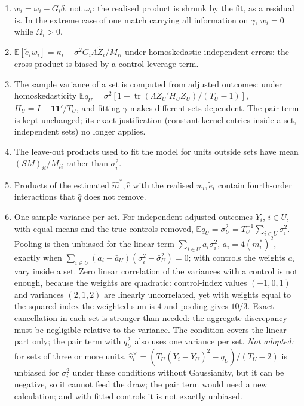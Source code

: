 \documentclass[11pt]{article}
\newcommand{\E}{\mathbb{E}}
\newcommand{\tr}{\operatorname{tr}}
\begin{document}
\begin{enumerate}
$\tr\{C(S_d-\hat H)C(S_d-\hat H)\}$, while $\hat L=4\hat m'(S_d-\hat H)\hat m$ exactly. The middle term is the average of
$u'\hat Hu$ over the existing draws; the last needs $2k$ further applications of $C$, whereas the present
implementation needs no linear solves beyond those of the model without controls. $S_d-\hat H$ need not be positive
semidefinite, so it cannot be drawn from.
\item $w_i=\omega_i-G_i\delta$, not $\omega_i$: the realised product is shrunk by the fit, as a residual is. In the
extreme case of one match carrying all information on $\gamma$, $w_i=0$ while $\Omega_i>0$.
\item $\E[\tilde e_iw_i]=\kappa_i-\sigma^2G_i\Lambda\tilde Z_i/M_{ii}$ under homoskedastic independent errors: the
cross product is biased by a control-leverage term.
\item The sample variance of a set is computed from adjusted outcomes: under homoskedasticity
$\E q_U=\sigma^2[1-\tr(\Lambda Z_U'H_UZ_U)/(T_U-1)]$, $H_U=I-\mathbf{11}'/T_U$, and fitting $\gamma$ makes different
sets dependent. The pair term is kept unchanged; its exact justification (constant kernel entries inside a set,
independent sets) no longer applies.
\item The leave-out products used to fit the model for units outside sets have mean $(SM)_{ii}/M_{ii}$ rather than
$\sigma_i^2$.
\item Products of the estimated $\hat m^\ast,\hat c$ with the realised $w_i,\tilde e_i$ contain fourth-order
interactions that $\hat q$ does not remove.
\item One sample variance per set. For independent adjusted outcomes $Y_i$, $i\in U$, with equal means and the true
controls removed, $\E q_U=\bar\sigma_U^2=T_U^{-1}\sum_{i\in U}\sigma_i^2$. Pooling is then unbiased for the linear
term $\sum_{i\in U}a_i\sigma_i^2$, $a_i=4(m_i^\ast)^2$, exactly when
$\sum_{i\in U}(a_i-\bar a_U)(\sigma_i^2-\bar\sigma_U^2)=0$; with controls the weights $a_i$ vary inside a set. Zero
linear correlation of the variances with a control is not enough, because the weights are quadratic: control-index
values $(-1,0,1)$ and variances $(2,1,2)$ are linearly uncorrelated, yet with weights equal to the squared index the
weighted sum is $4$ and pooling gives $10/3$. Exact cancellation in each set is stronger than needed: the aggregate
discrepancy must be negligible relative to the variance. The condition covers the linear part only; the pair term
with $q_U^2$ also uses one variance per set. \emph{Not adopted:} for sets of three or more units,
$\hat v_i^\times=(T_U(Y_i-\bar Y_U)^2-q_U)/(T_U-2)$ is unbiased for $\sigma_i^2$ under these conditions without
Gaussianity, but it can be negative, so it cannot feed the draw; the pair term would need a new calculation; and with
fitted controls it is not exactly unbiased.
\end{enumerate}
\end{document}

